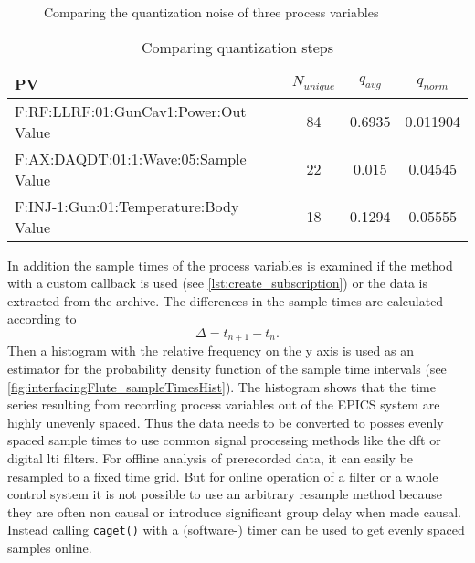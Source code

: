 \begin{figure}[tb]
		\hfill
        
        \hfill
        
        \hfill
       \caption{Comparing the quantization noise of three process variables}
    \label{fig:quantNoise}
\end{figure}

\begin{table}[tb]
\caption{Comparing quantization steps}\label{tab:interfacingFlute_quantSteps}
\centering
\begin{tabular}{lSSS}
\toprule
PV & {$N_{unique}$} & {$q_{avg}$} & {$q_{norm}$}\\
\midrule
F:RF:LLRF:01:GunCav1:Power:Out Value  & 84 & 0.6935 & 0.011904\\
F:AX:DAQDT:01:1:Wave:05:Sample Value  & 22 & 0.015  & 0.04545\\
F:INJ-1:Gun:01:Temperature:Body Value & 18 & 0.1294 & 0.05555\\
\bottomrule
\end{tabular}
\end{table}


In addition the sample times of the process variables is examined if the method with a custom callback is used (see \autoref{lst:create_subscription}) or the data is extracted from the archive. The differences in the sample times are calculated according to
\begin{equation}
\Delta=t_{n+1}-t_n.
\end{equation}
Then a histogram with the relative frequency on the y axis is used as an estimator for the probability density function of the sample time intervals (see \autoref{fig:interfacingFlute_sampleTimesHist}). The histogram shows that the time series resulting from recording process variables out of the EPICS system are highly unevenly spaced. Thus the data needs to be converted to posses evenly spaced sample times to use common signal processing methods like the \gls{dft} or digital \gls{lti} filters. For offline analysis of prerecorded data, it can easily be resampled to a fixed time grid. But for online operation of a filter or a whole control system it is not possible to use an arbitrary resample method because they are often non causal or introduce significant group delay when made causal. Instead calling \texttt{caget()} with a (software-) timer can be used to get evenly spaced samples online.

